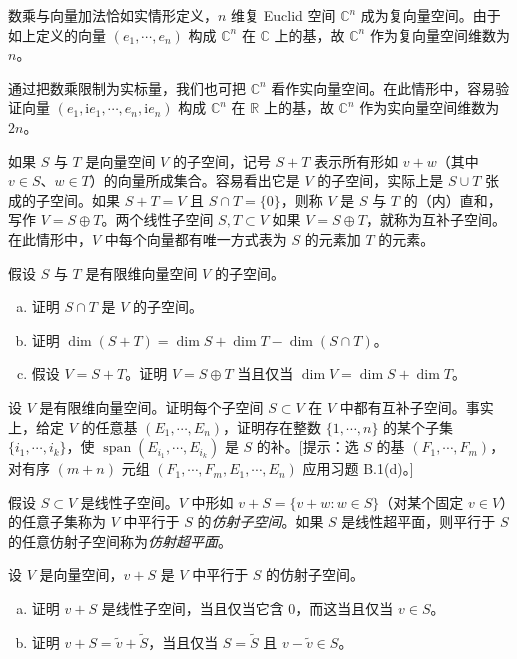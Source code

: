 \documentclass[../../main.tex]{subfiles}
\begin{document}
\begin{example}[复 Euclid 空间]\label{example:appB-complex-euclidean-spaces}
数乘与向量加法恰如实情形定义，$n$ 维复 Euclid 空间 $\mathbb C^n$ 成为复向量空间。由于如上定义的向量 $(e_1,\cdots ,e_n)$ 构成 $\mathbb C^n$ 在 $\mathbb C$ 上的基，故 $\mathbb C^n$ 作为复向量空间维数为 $n$。

通过把数乘限制为实标量，我们也可把 $\mathbb C^n$ 看作实向量空间。在此情形中，容易验证向量 $(e_1,\mathrm{i}e_1,\cdots ,e_n,\mathrm{i}e_n)$ 构成 $\mathbb C^n$ 在 $\mathbb R$ 上的基，故 $\mathbb C^n$ 作为实向量空间维数为 $2n$。
\end{example}

如果 $S$ 与 $T$ 是向量空间 $V$ 的子空间，记号 $S+T$ 表示所有形如 $v+w$（其中 $v\in S$、$w\in T$）的向量所成集合。容易看出它是 $V$ 的子空间，实际上是 $S\cup T$ 张成的子空间。如果 $S+T=V$ 且 $S\cap T=\{0\}$，则称 $V$ 是 $S$ 与 $T$ 的（内）直和，写作 $V=S\oplus T$。两个线性子空间 $S,T\subset V$ 如果 $V=S\oplus T$，就称为互补子空间。在此情形中，$V$ 中每个向量都有唯一方式表为 $S$ 的元素加 $T$ 的元素。

\begin{exercise}\label{exercise:appB-B-8}
假设 $S$ 与 $T$ 是有限维向量空间 $V$ 的子空间。
\begin{enumerate}[(a)]
\item 证明 $S\cap T$ 是 $V$ 的子空间。
\item 证明 $\dim(S+T)=\dim S+\dim T-\dim(S\cap T)$。
\item 假设 $V=S+T$。证明 $V=S\oplus T$ 当且仅当 $\dim V=\dim S+\dim T$。
\end{enumerate}
\end{exercise}

\begin{exercise}\label{exercise:appB-B-9}
设 $V$ 是有限维向量空间。证明每个子空间 $S\subset V$ 在 $V$ 中都有互补子空间。事实上，给定 $V$ 的任意基 $(E_1,\cdots ,E_n)$，证明存在整数 $\{1,\cdots ,n\}$ 的某个子集 $\{i_1,\cdots ,i_k\}$，使 $\operatorname{span}(E_{i_1},\cdots ,E_{i_k})$ 是 $S$ 的补。[提示：选 $S$ 的基 $(F_1,\cdots ,F_m)$，对有序 $(m+n)$ 元组 $(F_1,\cdots ,F_m,E_1,\cdots ,E_n)$ 应用习题 B.1(d)。]
\end{exercise}

假设 $S\subset V$ 是线性子空间。$V$ 中形如 $v+S=\{v+w:w\in S\}$（对某个固定 $v\in V$）的任意子集称为 $V$ 中平行于 $S$ 的\emph{仿射子空间}。如果 $S$ 是线性超平面，则平行于 $S$ 的任意仿射子空间称为\emph{仿射超平面}。

\begin{exercise}\label{exercise:appB-B-10}
设 $V$ 是向量空间，$v+S$ 是 $V$ 中平行于 $S$ 的仿射子空间。
\begin{enumerate}[(a)]
\item 证明 $v+S$ 是线性子空间，当且仅当它含 $0$，而这当且仅当 $v\in S$。
\item 证明 $v+S=\widetilde v+\widetilde S$，当且仅当 $S=\widetilde S$ 且 $v-\widetilde v\in S$。
\end{enumerate}
\end{exercise}
\end{document}
